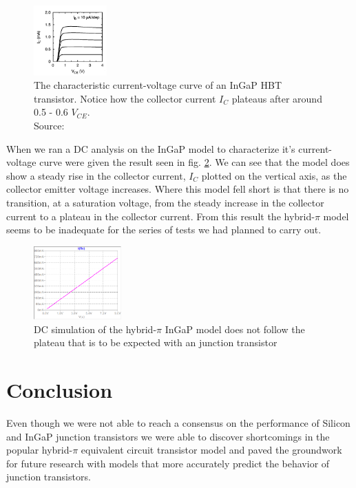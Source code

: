 \documentclass[conference]{IEEEtran}
\begin{document}
\begin{figure}[hbt!]
    \centerline{\includegraphics[width=0.25\textwidth]{figures/InGaP-IV.png}}
    \caption{The characteristic current-voltage curve of an InGaP HBT transistor. Notice how the collector current $I_C$ plateaus after around 0.5 - 0.6
    $V_{CE}$. \\ Source: \cite{Oka2001}}
    \label{fig:InGaP-IV}
\end{figure}

When we ran a DC analysis on the InGaP model to characterize it's current-voltage curve were given the result seen in fig. \ref{fig:InGaP-LT-IV}.
We can see that the model does show a steady rise in the collector current, $I_C$ plotted on the vertical axis, as the collector emitter voltage increases.
Where this model fell short is that there is no transition, at a saturation voltage, from the steady increase in the collector current to a plateau in the
collector current. From this result the hybrid-$\pi$ model seems to be inadequate for the series of tests we had planned to carry out.

\begin{figure}[hbt!]
    \centerline{\includegraphics[width=0.3\textwidth]{figures/InGaP-LT-IV.png}}
    \caption{DC simulation of the hybrid-$\pi$ InGaP model does not follow the plateau that is to be expected with an junction transistor}
    \label{fig:InGaP-LT-IV}
\end{figure}

\section{Conclusion}

Even though we were not able to reach a consensus on the performance of Silicon and InGaP junction transistors we were able to discover shortcomings in
the popular hybrid-$\pi$ equivalent circuit transistor model and paved the groundwork for future research with models that more accurately predict the
behavior of junction transistors.
\end{document}
